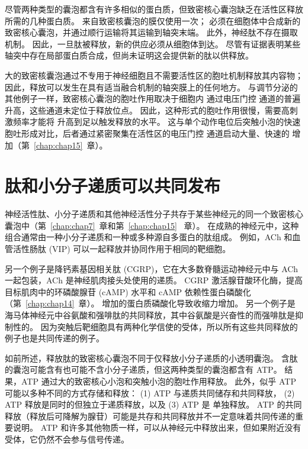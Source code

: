 尽管两种类型的囊泡都含有许多相似的蛋白质，但致密核心囊泡缺乏在活性区释放所需的几种蛋白质。
来自致密核囊泡的膜仅使用一次； 必须在细胞体中合成新的致密核心囊泡，并通过顺行运输将其运输到轴突末端。
此外，神经肽不存在摄取机制。
因此，一旦肽被释放，新的供应必须从细胞体到达。
尽管有证据表明某些轴突中存在局部蛋白质合成，但尚未证明这会提供新的肽以供释放。


大的致密核囊泡通过不专用于神经细胞且不需要活性区的胞吐机制释放其内容物；
因此，释放可以发生在具有适当融合机制的轴突膜上的任何地方。
与调节分泌的其他例子一样，致密核心囊泡的胞吐作用取决于细胞内  通过电压门控  通道的普遍升高，这些通道未定位于释放位点。
因此，这种形式的胞吐作用很慢，需要高刺激频率才能将  升高到足以触发释放的水平。
这与单个动作电位后突触小泡的快速胞吐形成对比，后者通过紧密聚集在活性区的电压门控  通道启动大量、快速的  增加（第~\ref{chap:chap15}~章）。



\section{肽和小分子递质可以共同发布}

神经活性肽、小分子递质和其他神经活性分子共存于某些神经元的同一个致密核心囊泡中（第~\ref{chap:chap7}~章和第~\ref{chap:chap15} ~章）。
在成熟的神经元中，这种组合通常由一种小分子递质和一种或多种源自多蛋白的肽组成。
例如，ACh 和血管活性肠肽 (VIP) 可以一起释放并协同作用于相同的靶细胞。


另一个例子是降钙素基因相关肽 (CGRP)，它在大多数脊髓运动神经元中与 ACh 一起包装，ACh 是神经肌肉接头处使用的递质。
CGRP 激活腺苷酸环化酶，提高目标肌肉中的环磷酸腺苷 (cAMP) 水平和 cAMP 依赖性蛋白磷酸化（第~\ref{chap:chap14}~章）。
增加的蛋白质磷酸化导致收缩力增加。
另一个例子是海马体神经元中谷氨酸和强啡肽的共同释放，其中谷氨酸是兴奋性的而强啡肽是抑制性的。
因为突触后靶细胞具有两种化学信使的受体，所以所有这些共同释放的例子也是共同传递的例子。


如前所述，释放肽的致密核心囊泡不同于仅释放小分子递质的小透明囊泡。
含肽的囊泡可能含有也可能不含小分子递质，但这两种类型的囊泡都含有 ATP。
结果，ATP 通过大的致密核心小泡和突触小泡的胞吐作用释放。
此外，似乎 ATP 可能以多种不同的方式存储和释放：
(1) ATP 与递质共同储存和共同释放，
(2) ATP 释放是同时的但独立于递质释放，以及 
(3) ATP 是 单独释放。
ATP 的共同释放（释放后可降解为腺苷）可能是共存和共同释放并不一定意味着共同传递的重要说明。
ATP 和许多其他物质一样，可以从神经元中释放出来，但如果附近没有受体，它仍然不会参与信号传递。


